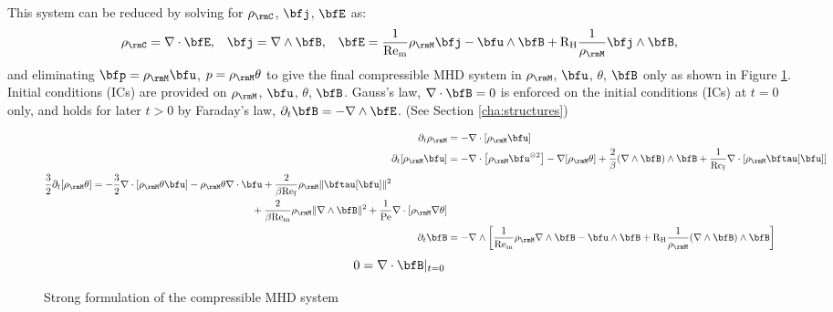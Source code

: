    This system can be reduced by solving for $\rho_{\rmC}$, $\bfj$, $\bfE$ as:
    \begin{align}
        \rho_{\rmC}  =  \nabla\cdot\bfE,  &&
               \bfj  =  \nabla\wedge\bfB,  &&
               \bfE  =  \frac{1}{\rmRem}\rho_{\rmM}\bfj - \bfu\wedge\bfB + \rmRH\frac{1}{\rho_{\rmM}}\bfj\wedge\bfB,
    \end{align}
    and eliminating $\bfp  =  \rho_{\rmM}\bfu$, $p  =  \rho_{\rmM}\theta$ to give the final compressible MHD system in $\rho_{\rmM}$, $\bfu$, $\theta$, $\bfB$ only as shown in Figure \ref{fig:compressible strong form}. Initial conditions (ICs) are provided on $\rho_{\rmM}$, $\bfu$, $\theta$, $\bfB$. Gauss's law, $\nabla\cdot\bfB  =  0$ is enforced on the initial conditions (ICs) at $t  =  0$ only, and holds for later $t  >  0$ by Faraday's law, $\partial_{t}\bfB  =  - \nabla\wedge\bfE$. (See Section \ref{cha:structures})

    \begin{figure}
        \centering
        \line
        \begin{align}
                           \partial_{t}\rho_{\rmM}          &=  - \nabla\cdot[\rho_{\rmM}\bfu]  \\
                           \partial_{t}[\rho_{\rmM}\bfu]    &=  - \nabla\cdot\left[\rho_{\rmM}\bfu^{\otimes 2}\right] - \nabla[\rho_{\rmM}\theta] + \frac{2}{\beta}(\nabla\wedge\bfB)\wedge\bfB + \frac{1}{\rmRef}\nabla\cdot[\rho_{\rmM}\bftau[\bfu]]  \\
            \begin{split}
                \frac{3}{2}\partial_{t}[\rho_{\rmM}\theta]  &=  - \frac{3}{2}\nabla\cdot[\rho_{\rmM}\theta\bfu] - \rho_{\rmM}\theta\nabla\cdot\bfu + \frac{2}{\beta\rmRef}\rho_{\rmM}\|\bftau[\bfu]\|^{2}  \\
                    &\qquad\qquad\qquad\qquad\qquad\qquad\qquad\qquad+ \frac{2}{\beta\rmRem}\rho_{\rmM}\|\nabla\wedge\bfB\|^{2} + \frac{1}{\rmPe}\nabla\cdot[\rho_{\rmM}\nabla\theta]
            \end{split}  \\
                           \partial_{t}\bfB                 &=  - \nabla\wedge\left[\frac{1}{\rmRem}\rho_{\rmM}\nabla\wedge\bfB - \bfu\wedge\bfB + \rmRH\frac{1}{\rho_{\rmM}}(\nabla\wedge\bfB)\wedge\bfB\right]
        \end{align}
        \shortline
        \begin{equation}
            0  =  \nabla\cdot\bfB|_{t = 0}
        \end{equation}
        \line
        \caption{Strong formulation of the compressible MHD system}
        \label{fig:compressible strong form}
    \end{figure}

